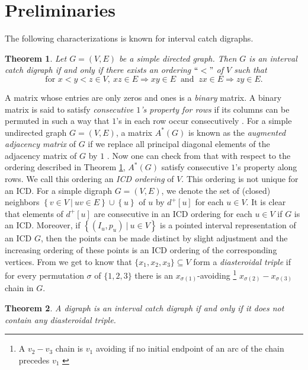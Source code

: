 \documentclass{article}
\newtheorem{thm}{Theorem}[section]
\theoremstyle{definition}
\numberwithin{equation}{section}
\newcommand{\set}[1]{\left\{#1\right\}}
\newcommand{\Set}[2]{\set{#1\ \vert\ #2}}
\begin{document}
\section{Preliminaries}

\noindent The following characterizations is known for interval catch digraphs.

\begin{thm} \cite{Prisner} \label{e1}
Let $G=(V,E)$ be a simple directed graph. Then $G$ is an interval catch digraph if and only if there exists an ordering $``<"$ of $V$ such that
\begin{equation}\label{icd1}
\text{for }x<y<z\in V,\ xz\in E\Longrightarrow xy\in E \ \text{ and }\ zx\in E\Longrightarrow zy\in E.
\end{equation}
\end{thm}

\noindent  A matrix whose entries are only zeros and ones is a {\em binary} matrix. A binary matrix is said to satisfy {\em consecutive $1$'s property for rows} if its columns can be permuted in such a way that $1$'s in each row occur consecutively \cite{G}. For a simple undirected graph $G=(V,E)$, a matrix $A^{*}(G)$ is known as the {\em augmented adjacency matrix} of $G$ if we replace all principal diagonal elements of the adjacency matrix of $G$ by $1$ \cite{G}. 
Now one can check from \cite{Maehera} that with respect to the ordering described in Theorem \ref{e1}, $A^{*}(G)$ satisfy consecutive $1$'s property along rows. We call this ordering an {\em ICD ordering} of $V$. This ordering is not unique for an ICD. For a simple digraph $G=(V,E)$, we denote the set of (closed) neighbors $\Set{v\in V}{uv\in E}\cup\set{u}$ of $u$ by $d^+[u]$ for each $u\in V$. It is clear that elements of $d^+[u]$ are consecutive in an ICD ordering for each $u\in V$ if $G$ is an ICD. Moreover, if $\Set{(I_{u},p_{u})}{u\in V}$ is a pointed interval representation of an ICD $G$, then the points can be made distinct by slight adjustment and the increasing ordering of these points is an ICD ordering of the corresponding vertices. From \cite{ Golumbic2} we get to know that $\{x_{1},x_{2},x_{3}\}\subseteq V$ form a {\em diasteroidal triple} if for every permutation $\sigma$ of $\{1,2,3\}$ there is an $x_{\sigma(1)}$-avoiding \footnote{
A $v_{2}-v_{3}$ chain is $v_{1}$ avoiding if no initial endpoint of an arc of the chain precedes $v_{1}$ \cite{Golumbic2}} $x_{\sigma(2)}-x_{\sigma(3)}$ chain in $G$. 

\begin{thm} \cite{Prisner} \label{diate}
A digraph is an interval catch digraph if and only if it does not contain any diasteroidal triple.
\end{thm}
\end{document}
